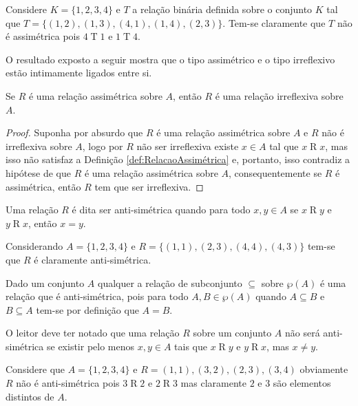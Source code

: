 \begin{exemplo}
	Considere  $K = \{1, 2, 3, 4\}$ e $T$ a relação binária definida sobre o conjunto $K$ tal que $T = \{(1,2), (1, 3), (4, 1), (1, 4), (2, 3)\}$. Tem-se claramente que $T$ não é assimétrica pois $4 \mathrel{T} 1$ e $1 \mathrel{T} 4$.
\end{exemplo}

O resultado exposto a seguir mostra que o tipo assimétrico e o tipo irreflexivo estão intimamente ligados entre si.

\begin{teorema}
	Se $R$ é uma relação assimétrica sobre $A$, então $R$ é uma relação irreflexiva sobre $A$.
\end{teorema}

\begin{proof}
	Suponha por absurdo que $R$ é uma relação assimétrica sobre $A$ e $R$ não é irreflexiva sobre $A$, logo por $R$ não ser irreflexiva existe $x \in A$ tal que  $x \mathrel{R} x$, mas isso não satisfaz a Definição \ref{def:RelacaoAssimétrica} e, portanto, isso contradiz a hipótese de que $R$ é uma relação assimétrica sobre $A$, consequentemente se $R$ é assimétrica, então $R$ tem que ser irreflexiva. 
\end{proof}

\begin{definicao}\label{def:RelacaoAntiSimétrica}
	Uma relação $R$ é dita ser anti-simétrica quando para todo $x, y \in A$ se $x \mathrel{R} y$ e $y \mathrel{R} x$, então $x = y$.
\end{definicao}

\begin{exemplo}
	Considerando $A = \{1,2,3,4\}$ e $R = \{(1,1), (2,3), (4,4), (4,3)\}$ tem-se que $R$ é claramente anti-simétrica.
\end{exemplo}

\begin{exemplo}
	Dado um conjunto $A$ qualquer a relação de subconjunto $\subseteq$ sobre $\wp(A)$ é uma relação que é anti-simétrica, pois para todo $A, B \in \wp(A)$ quando $A \subseteq B$ e $B \subseteq A$ tem-se por definição que $A = B$.
\end{exemplo}

O leitor deve ter notado que uma relação $R$ sobre um conjunto $A$ não será anti-simétrica se existir pelo menos $x,y \in A$ tais que $x \mathrel{R} y$ e $y \mathrel{R} x$, mas $x \neq y$. 

\begin{exemplo}
	Considere que $A = \{1,2,3,4\}$ e $R = {(1,1), (3,2), (2,3), (3,4)}$ obviamente $R$ não é anti-simétrica pois $3 \mathrel{R} 2$ e $2 \mathrel{R} 3$ mas claramente $2$ e $3$ são elementos distintos de $A$. 
\end{exemplo}


